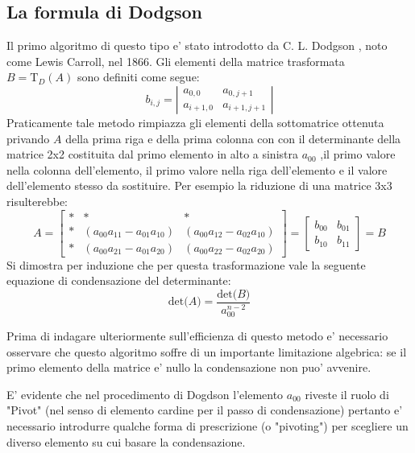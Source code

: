 \documentclass{article}
\begin{document}
\subsection{La formula di Dodgson}
Il primo algoritmo di questo tipo e' stato introdotto da C. L. Dodgson \cite{Carroll}, noto come Lewis Carroll, nel 1866.
Gli elementi della matrice trasformata $B = \mbox{T}_{D}(A)$ sono definiti come segue:
\begin{equation}\label{eq:Dodgson}
b_{i,j} =
\left| \begin{array}{cc} a_{0,0} & a_{0,j+1}  \\ a_{i+1 , 0} & a_{i+1 , j+1}  \end{array} \right| 
\end{equation}
Praticamente tale metodo rimpiazza gli elementi della sottomatrice ottenuta privando $A$ della prima riga e della prima colonna con con il determinante della matrice 2x2 costituita dal primo elemento in alto a sinistra $a_{00}$ ,il primo valore nella colonna dell'elemento, il primo valore nella riga dell'elemento e il valore dell'elemento stesso da sostituire.
Per esempio la riduzione di una matrice 3x3 risulterebbe:
\begin{displaymath}
	A =
\left[ \begin{array}{ccc} \ast & \ast & \ast  \\ \ast & (a_{00}a_{11} - a_{01}a_{10}) & (a_{00}a_{12} - a_{02}a_{10}) \\ \ast & (a_{00}a_{21} - a_{01}a_{20}) & (a_{00}a_{22} - a_{02}a_{20})  \end{array} \right] 
	=
\left[ \begin{array}{cc} b_{00} & b_{01} \\ b_{10} & b_{11} \end{array} \right]
	=
	B
\end{displaymath}
Si dimostra per induzione che per questa trasformazione vale la seguente  equazione di condensazione del determinante:
\begin{equation}
 \mbox{det}\big(A\big) = \dfrac{\mbox{det}\big(B\big)}{a_{00}^{n-2}}
\end{equation}

Prima di indagare ulteriormente sull'efficienza di questo metodo e' necessario osservare che questo algoritmo soffre di un importante limitazione algebrica: se il primo elemento della matrice e' nullo la condensazione non puo' avvenire.

E' evidente che nel procedimento di Dogdson l'elemento $a_{00}$ riveste il ruolo di "Pivot" (nel senso di elemento cardine per il passo di condensazione) pertanto e' necessario introdurre qualche forma di prescrizione (o "pivoting") per scegliere un diverso elemento su cui basare la condensazione.
\end{document}
